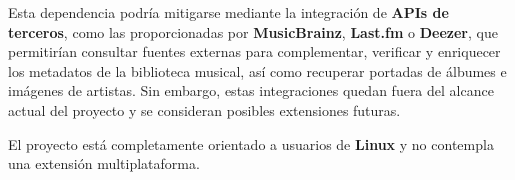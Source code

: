 Esta dependencia podría mitigarse mediante la integración de \textbf{APIs de terceros}, como las proporcionadas
por \textbf{MusicBrainz}, \textbf{Last.fm} o \textbf{Deezer}, que permitirían consultar fuentes externas
para complementar, verificar y enriquecer los metadatos de la biblioteca musical, así como recuperar
portadas de álbumes e imágenes de artistas. Sin embargo, estas integraciones quedan fuera del alcance
actual del proyecto y se consideran posibles extensiones futuras.

El proyecto está completamente orientado a usuarios de \textbf{Linux} y no contempla una extensión
multiplataforma.
